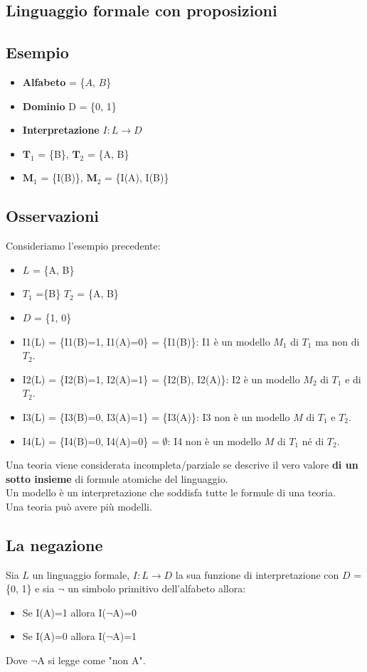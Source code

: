 \documentclass{book}
\begin{document}
    \subsection{Linguaggio formale con proposizioni}
    \subsection{Esempio}
    \begin{itemize}
        \item \textbf{Alfabeto} = \{$A$, $B$\}
        \item \textbf{Dominio} D = \{0, 1\}
        \item \textbf{Interpretazione} $I:L \to D$
        \item $\textbf{T}_1$ = \{B\}, $\textbf{T}_2$ = \{A, B\}
        \item $\textbf{M}_1$ = \{I(B)\}, $\textbf{M}_2$ = \{I(A), I(B)\}
    \end{itemize}

    \subsection{Osservazioni}
    Consideriamo l'esempio precedente:
    \begin{itemize}
        \item $L$ = \{A, B\}
        \item $T_1$ =\{B\} $T_2$ = \{A, B\}
        \item $D$ = \{1, 0\}
        \item I1(L) = \{I1(B)=1, I1(A)=0\} = \{I1(B)\}: I1 è un modello $M_1$ di $T_1$ ma non di $T_2$.
        \item I2(L) = \{I2(B)=1, I2(A)=1\} = \{I2(B), I2(A)\}: I2 è un modello $M_2$ di $T_1$ e di $T_2$.
        \item I3(L) = \{I3(B)=0, I3(A)=1\} = \{I3(A)\}: I3 non è un modello $M$ di $T_1$ e $T_2$.
        \item I4(L) = \{I4(B)=0, I4(A)=0\} = $\emptyset$: I4 non è un modello $M$ di $T_1$ né di $T_2$.
    \end{itemize}
    Una teoria viene considerata incompleta/parziale se descrive il vero valore \textbf{di un sotto insieme} di formule atomiche del linguaggio.\\
    Un modello è un interpretazione che soddisfa tutte le formule di una teoria.\\
    Una teoria può avere più modelli.

    \subsection{La negazione}
    Sia $L$ un linguaggio formale, $I:L \to D$ la sua funzione di interpretazione con $D$ = \{0, 1\} e sia $\lnot$ un simbolo primitivo dell'alfabeto allora:
    \begin{itemize}
        \item Se I(A)=1 allora I($\lnot$A)=0
        \item Se I(A)=0 allora I($\lnot$A)=1
    \end{itemize}
    Dove $\lnot$A si legge come "non A".
\end{document}
